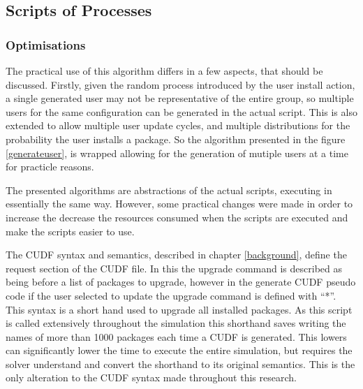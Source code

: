 


\subsection{Scripts of Processes}
\subsubsection{Optimisations}

The practical use of this algorithm differs in a few aspects, that should be discussed.
Firstly, given the random process introduced by the user install action,
a single generated user may not be representative of the entire group, so multiple users for the same configuration can be generated in the actual script.
This is also extended to allow multiple user update cycles, and multiple distributions for the probability the user installs a package.
So the algorithm presented in the figure \ref{generateuser}, is wrapped allowing for the generation of mutiple users at a time for practicle reasons.   

The presented algorithms are abstractions of the actual scripts, executing in essentially the same way. 
However, some practical changes were made in order to increase the decrease the resources consumed when the scripts are executed and make the scripts easier to use.

The CUDF syntax and semantics, described in chapter \ref{background}, define the request section of the CUDF file.
In this the upgrade command is described as being before a list of packages to upgrade,
however in the generate CUDF pseudo code if the user selected to update the upgrade command is defined with ``*''.
This syntax is a short hand used to upgrade all installed packages.
As this script is called extensively throughout the simulation this shorthand saves writing the names of more than 1000 packages each time a CUDF is generated.
This lowers can significantly lower the time to execute the entire simulation, but requires the solver understand and convert the shorthand to its original semantics.
This is the only alteration to the CUDF syntax made throughout this research.

